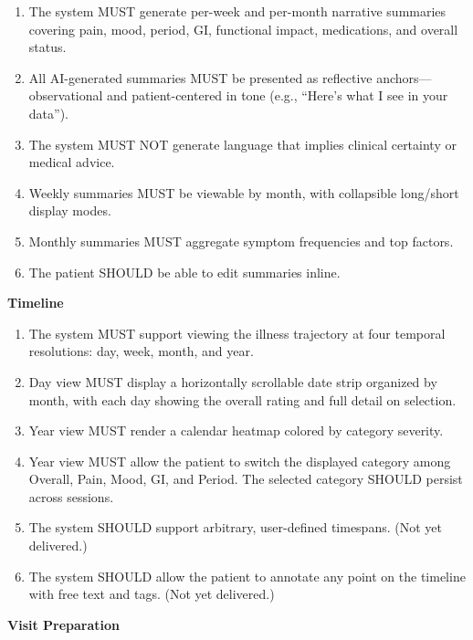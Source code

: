 \begin{enumerate}
  \item The system MUST generate per-week and per-month narrative summaries covering pain, mood, period, GI, functional impact, medications, and overall status.
  \item All AI-generated summaries MUST be presented as reflective anchors---observational and patient-centered in tone (e.g., ``Here's what I see in your data'').
  \item The system MUST NOT generate language that implies clinical certainty or medical advice.
  \item Weekly summaries MUST be viewable by month, with collapsible long/short display modes.
  \item Monthly summaries MUST aggregate symptom frequencies and top factors.
  \item The patient SHOULD be able to edit summaries inline.
\end{enumerate}

\textbf{Timeline}

\begin{enumerate}
  \item The system MUST support viewing the illness trajectory at four temporal resolutions: day, week, month, and year.
  \item Day view MUST display a horizontally scrollable date strip organized by month, with each day showing the overall rating and full detail on selection.
  \item Year view MUST render a calendar heatmap colored by category severity.
  \item Year view MUST allow the patient to switch the displayed category among Overall, Pain, Mood, GI, and Period. The selected category SHOULD persist across sessions.
  \item The system SHOULD support arbitrary, user-defined timespans. (Not yet delivered.)
  \item The system SHOULD allow the patient to annotate any point on the timeline with free text and tags. (Not yet delivered.)
\end{enumerate}

\textbf{Visit Preparation}

